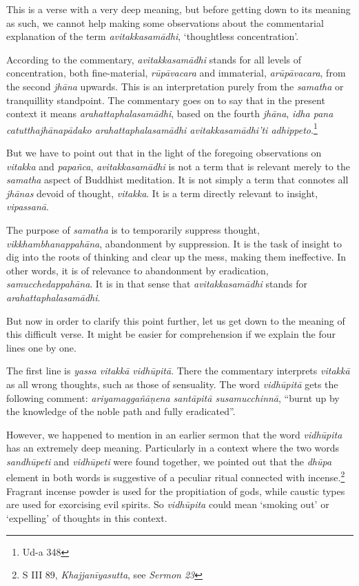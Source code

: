 This is a verse with a very deep meaning, but before getting down to its meaning as such, we cannot help making some observations about the commentarial explanation of the term \emph{avitakkasamādhi}, `thoughtless concentration'.

According to the commentary, \emph{avitakkasamādhi} stands for all levels of concentration, both fine-material, \emph{rūpāvacara} and immaterial, \emph{arūpāvacara}, from the second \emph{jhāna} upwards. This is an interpretation purely from the \emph{samatha} or tranquillity standpoint. The commentary goes on to say that in the present context it means \emph{arahattaphalasamādhi}, based on the fourth \emph{jhāna}, \emph{idha pana catutthajhānapādako arahattaphalasamādhi avitakkasamādhi'ti adhippeto}.\footnote{Ud-a 348}

But we have to point out that in the light of the foregoing observations on \emph{vitakka} and \emph{papañca}, \emph{avitakkasamādhi} is not a term that is relevant merely to the \emph{samatha} aspect of Buddhist meditation. It is not simply a term that connotes all \emph{jhānas} devoid of thought, \emph{vitakka}. It is a term directly relevant to insight, \emph{vipassanā}.

The purpose of \emph{samatha} is to temporarily suppress thought, \emph{vikkhambhanappahāna}, abandonment by suppression. It is the task of insight to dig into the roots of thinking and clear up the mess, making them ineffective. In other words, it is of relevance to abandonment by eradication, \emph{samucchedappahāna}. It is in that sense that \emph{avitakkasamādhi} stands for \emph{arahattaphalasamādhi}.

But now in order to clarify this point further, let us get down to the meaning of this difficult verse. It might be easier for comprehension if we explain the four lines one by one.

The first line is \emph{yassa vitakkā vidhūpitā}. There the commentary interprets \emph{vitakkā} as all wrong thoughts, such as those of sensuality. The word \emph{vidhūpitā} gets the following comment: \emph{ariyamaggañāṇena santāpitā susamucchinnā}, ``burnt up by the knowledge of the noble path and fully eradicated''.

However, we happened to mention in an earlier sermon that the word \emph{vidhūpita} has an extremely deep meaning. Particularly in a context where the two words \emph{sandhūpeti} and \emph{vidhūpeti} were found together, we pointed out that the \emph{dhūpa} element in both words is suggestive of a peculiar ritual connected with incense.\footnote{S III 89, \emph{Khajjanīyasutta}, see \emph{Sermon 23}} Fragrant incense powder is used for the propitiation of gods, while caustic types are used for exorcising evil spirits. So \emph{vidhūpita} could mean `smoking out' or `expelling' of thoughts in this context.

